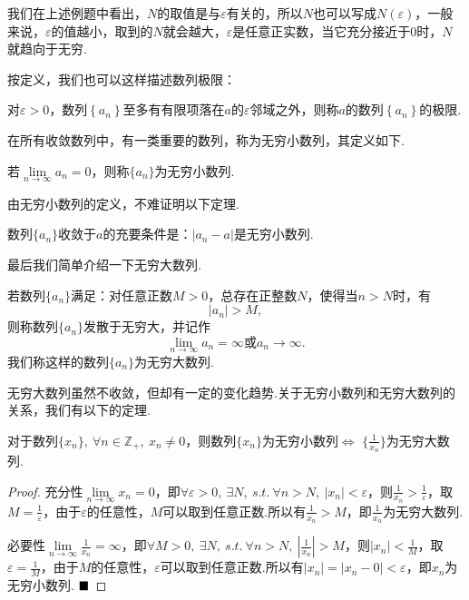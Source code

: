 我们在上述例题中看出，$N$的取值是与$\varepsilon$有关的，所以$N$也可以写成$N(\varepsilon)$，一般来说，$\varepsilon$的值越小，取到的$N$就会越大，$\varepsilon$是任意正实数，当它充分接近于$0$时，$N$就趋向于无穷.

按定义，我们也可以这样描述数列极限：
\begin{definition}[数列极限]
	对$\varepsilon>0$，数列$\left\{a_n\right\}$至多有有限项落在$a$的$\varepsilon$邻域之外，则称$a$的数列$\left\{a_n\right\}$的极限.
\end{definition}
在所有收敛数列中，有一类重要的数列，称为无穷小数列，其定义如下.
\begin{definition}[无穷小数列]
	若$\lim\limits_{n\to\infty}a_n=0$，则称$\{a_n\}$为{\heiti 无穷小数列}.
\end{definition}
由无穷小数列的定义，不难证明以下定理.
\begin{theorem}
	数列$\{a_n\}$收敛于$a$的充要条件是：$|a_n-a|$是无穷小数列.
\end{theorem}
最后我们简单介绍一下无穷大数列.
\begin{definition}[无穷大数列]
	若数列$\{a_n\}$满足：对任意正数$M>0$，总存在正整数$N$，使得当$n>N$时，有$$|a_n|>M,$$则称数列$\{a_n\}$发散于无穷大，并记作
	$$\lim\limits_{n\to\infty}a_n=\infty\mbox{或}a_n\to\infty.$$
	我们称这样的数列$\{a_n\}$为{\heiti 无穷大数列}.
\end{definition}
无穷大数列虽然不收敛，但却有一定的变化趋势.关于无穷小数列和无穷大数列的关系，我们有以下的定理.
\begin{theorem}
	对于数列$\{x_n\},\ \forall n\in \mathbb{Z}_+,\ x_n\neq 0$，则数列$\{x_n\}$为无穷小数列$\iff$ $\{\frac{1}{x_n}\}$为无穷大数列.
\end{theorem}
\begin{proof}
	充分性\qquad $\lim\limits_{n\to\infty}x_n=0$，即$\forall \varepsilon>0,\ \exists N,\ s.t.\ \forall n>N,\ |x_n|<\varepsilon$，则$\frac{1}{x_n}>\frac{1}{\varepsilon}$，取$M=\frac{1}{\varepsilon}$，由于$\varepsilon$的任意性，$M$可以取到任意正数.所以有$\frac{1}{x_n}>M$，即$\frac{1}{x_n}$为无穷大数列.
	
	必要性\qquad $\lim\limits_{n\to\infty}\frac{1}{x_n}=\infty$，即$\forall M>0,\ \exists N,\ s.t.\ \forall n>N,\ |\frac{1}{x_n}|>M$，则$|x_n|<\frac{1}{M}$，取$\varepsilon=\frac{1}{M}$，由于$M$的任意性，$\varepsilon$可以取到任意正数.所以有$|x_n|=|x_n-0|<\varepsilon$，即$x_n$为无穷小数列.
	$\hfill\blacksquare$
\end{proof}
